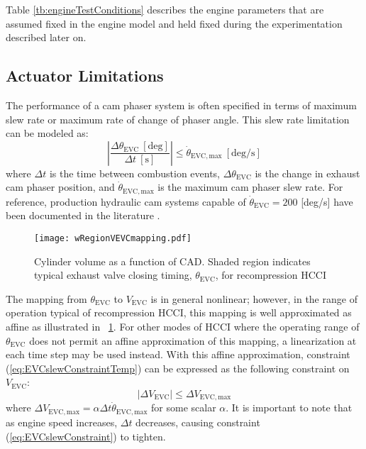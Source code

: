 Table \ref{tb:engineTestConditions} describes the engine parameters that are assumed fixed in the engine model and held fixed during the experimentation described later on.

\subsection{Actuator Limitations}
\label{sec:inputConstraints}
The performance of a cam phaser system is often specified in terms of maximum slew rate or maximum rate of change of phaser angle. This slew rate limitation can be modeled as:
\begin{equation}
\left|\frac{\Delta\theta_{\mathrm{EVC}}~[\mathrm{deg}]}{\Delta t~[\mathrm{s}]}\right| \leq \dot{\theta}_{\mathrm{EVC,max}}~[\mathrm{deg/s}] \label{eq:EVCslewConstraintTemp}
\end{equation}
where $\Delta t$ is the time between combustion events, $\Delta\theta_{\mathrm{EVC}}$ is the change in exhaust cam phaser position, and $\dot{\theta}_{\mathrm{EVC,max}}$ is the maximum cam phaser slew rate. For reference, production hydraulic cam systems capable of $\dot{\theta}_{\mathrm{EVC}} = 200$ [deg/s] have been documented in the literature \cite{Sinnamon2007}.

\begin{figure}
\centering
\texttt{[image: wRegionVEVCmapping.pdf]}
\caption{Cylinder volume as a function of CAD. Shaded region indicates typical exhaust valve closing timing, $\theta_{\mathrm{EVC}}$, for recompression HCCI}
\label{fig:VEVCmapping}
\end{figure}

The mapping from $\theta_{\mathrm{EVC}}$ to $V_{\mathrm{EVC}}$ is in general nonlinear; however, in the range of operation typical of recompression HCCI, this mapping is well approximated as affine as illustrated in \figurename~\ref{fig:VEVCmapping}. For other modes of HCCI where the operating range of $\theta_{\mathrm{EVC}}$ does not permit an affine approximation of this mapping, a linearization at each time step may be used instead. With this affine approximation, constraint (\ref{eq:EVCslewConstraintTemp}) can be expressed as the following constraint on $V_{\mathrm{EVC}}$:
\begin{equation}
\left|\Delta V_{\mathrm{EVC}} \right| \leq \Delta V_{\mathrm{EVC,max}} \label{eq:EVCslewConstraint}
\end{equation}
where $\Delta V_{\mathrm{EVC,max}} = \alpha \Delta t \dot{\theta}_{\mathrm{EVC,max}}$ for some scalar $\alpha$. It is important to note that as engine speed increases, $\Delta t$ decreases, causing constraint (\ref{eq:EVCslewConstraint}) to tighten.


